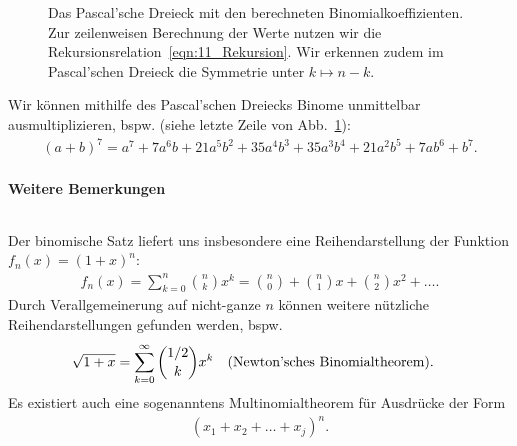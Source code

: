 \begin{figure}[htp]
    \centering
    \caption{Das Pascal'sche Dreieck mit den berechneten Binomialkoeffizienten. Zur zeilenweisen Berechnung der Werte nutzen wir die Rekursionsrelation~\eqref{eqn:11_Rekursion}. Wir erkennen zudem im Pascal'schen Dreieck die Symmetrie unter $k \mapsto n-k$.}
    \label{fig:11_Pascal2}
\end{figure}

Wir können mithilfe des Pascal'schen Dreiecks Binome unmittelbar ausmultiplizieren, bspw. (siehe letzte Zeile von Abb.~\ref{fig:11_Pascal2}): 
\begin{align}
    (a+b)^7 = a^7 + 7 a^6 b + 21 a^5 b^2 + 35 a^4 b^3 + 35 a^3 b^4 + 21 a^2 b^5 + 7 ab^6 + b^7.
\end{align}

\paragraph{Weitere Bemerkungen}$~$

Der binomische Satz liefert uns insbesondere eine Reihendarstellung der Funktion $f_n(x) = (1+x)^n$: 
\begin{align}
    f_n(x) = \sum_{k=0}^n \binom{n}{k} x^k = \binom{n}{0} + \binom{n}{1} x + \binom{n}{2} x^2 + \hdots.
\end{align}
Durch Verallgemeinerung auf nicht-ganze $n$ können weitere nützliche Reihendarstellungen gefunden werden, bspw. 
\begin{align}
    \sqrt{1+x} = \sum_{k=0}^\infty \binom{1/2}{k} x^k \qq{(Newton'sches Binomialtheorem).}
\end{align}
Es existiert auch eine sogenanntens Multinomialtheorem für Ausdrücke der Form 
\begin{align}
    (x_1 + x_2 + \hdots + x_j)^n.
\end{align}